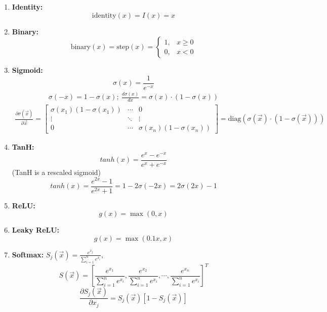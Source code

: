 \documentclass[11pt,a4paper]{article}
\begin{document}
\begin{enumerate}[(1)]
    \item \textbf{Identity:} $$\text{identity}(x)=I(x)=x$$
    \item \textbf{Binary:} $$\text{binary}(x)=\text{step}(x)=\left\{\begin{matrix}
        1,&x\geq 0\\
        0,&x<0
    \end{matrix}\right.$$
    \item \textbf{Sigmoid:}$$\sigma(x)=\frac{1}{e^{-x}}$$
    \begin{equation}
        \begin{aligned}
            \sigma(-x)=1-\sigma(x);\
            \frac{d\sigma(x)}{dx}=\sigma(x)\cdot(1-\sigma(x))
        \end{aligned}
        \nonumber
    \end{equation}
    \begin{equation}
        \begin{aligned}
            \frac{\partial \sigma(\vec{x})}{\partial \vec{x}}=\begin{bmatrix}
                \sigma(x_1)(1-\sigma(x_1)) &\cdots&0\\
                \vdots&\ddots&\vdots\\
                0&\cdots&\sigma(x_n)(1-\sigma(x_n))
            \end{bmatrix}=\text{diag}(\sigma(\vec{x})\cdot (1-\sigma(\vec{x})))
        \end{aligned}
        \nonumber
    \end{equation}
    \item \textbf{TanH:} $$tanh(x)=\frac{e^x-e^{-x}}{e^x+e^{-x}}$$(TanH is a rescaled sigmoid) $$tanh(x)=\frac{e^{2x}-1}{e^{2x}+1}=1-2\sigma(-2x)=2\sigma(2x)-1$$
    \item \textbf{ReLU:} $$g(x)=\max(0,x)$$
    \item \textbf{Leaky ReLU:} $$g(x)=\max(0.1x,x)$$
    \item \textbf{Softmax:} $S_j(\vec{x})=\frac{e^{x_j}}{\sum_{i=1}^ne^{x_i}}$, $$S(\vec{x})=\left[\frac{e^{x_1}}{\sum_{i=1}^ne^{x_i}},\frac{e^{x_2}}{\sum_{i=1}^ne^{x_i}},\cdots, \frac{e^{x_n}}{\sum_{i=1}^ne^{x_i}}\right]^T$$
    $$\frac{\partial S_j(\vec{x})}{\partial x_j}=S_j(\vec{x})[1-S_j(\vec{x})]$$
\end{enumerate}
\end{document}
